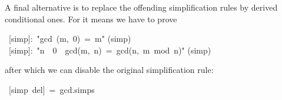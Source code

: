 \begin{isabelle}
\begin{isamarkuptext}
A final alternative is to replace the offending simplification rules by
derived conditional ones. For  it means we have to prove%
\end{isamarkuptext}%
\ [simp]:\ {"}gcd\ (m,\ 0)\ =\ m{"}\isanewline
{}(simp)\isanewline
{}\ [simp]:\ {"}n\ {\isasymnoteq}\ 0\ {\isasymLongrightarrow}\ gcd(m,\ n)\ =\ gcd(n,\ m\ mod\ n){"}\isanewline
{}(simp)%
\begin{isamarkuptext}%
\noindent
after which we can disable the original simplification rule:%
\end{isamarkuptext}%
\ [simp\ del]\ =\ gcd.simps\isanewline
\end{isabelle}%
